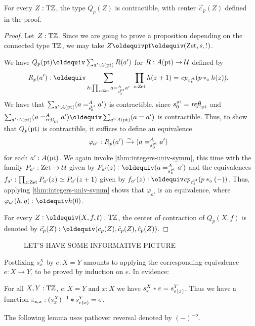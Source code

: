 \documentclass[a4,12pt]{amsart}
\begin{document}
\begin{lemma}\label{lem:guided-null-hmtps-dep}
  For every $Z:{\mathrm{T}\mathbb{Z}}$, the type $Q_p(Z)$ is contractible, 
  with center $\vec{c}_p(Z)$ defined in the proof.
\end{lemma}
\begin{proof}
  Let $Z:{\mathrm{T}\mathbb{Z}}$. Since we are going to prove a proposition
  depending on the connected type ${\mathrm{T}\mathbb{Z}}$,
  we may take $Z\jdeq\pt\jdeq(\zet,s,!)$.

  We have $Q_p(\pt)\jdeq \sum_{a':A(\pt)} R(a')$ for $R : A({\mathord{\mathrm{pt}}}) \to \mathcal{U}$ defined by
  \[
    R_p(a') \defeq \sum_{h : \prod_{z:\zet} a =^A_{s^\pt_z} a'}~\prod_{z:\zet} h(z+1) =  
    \cp{\varepsilon^\pt_z}(p \cto h(z)).
  \]
  We have that $\sum_{a':A({\mathord{\mathrm{pt}}})} (a =^A_{s^{\mathord{\mathrm{pt}}}_0} {a'})$ is contractible,
  since $s^{\mathord{\mathrm{pt}}}_0 = \mathop{{\it refl}_{{\mathord{\mathrm{pt}}}}}$ and 
  $\sum_{a':A(\pt)} (a =^A_{\refl{\pt}} a') \jdeq \sum_{a':A(\pt)} (a = a')$
  is contractible.
  Thus, to show that $Q_p({\mathord{\mathrm{pt}}})$ is contractible,
  it suffices to define an equivalence
  \[
    \varphi_{a'} : R_p(a') \xrightarrow{\sim}{} (a =^A_{s^{\mathord{\mathrm{pt}}}_0} {a'})
  \]
  for each $a' : A({\mathord{\mathrm{pt}}})$.
  We again invoke \cref{thm:integers-univ-symm},
  this time with the family $P_{a'} : \mathrm{Zet} \to \mathcal{U}$ given 
  by $P_{a'}(z) \defeq (a =^A_{s^\pt_z} {a'})$
  and the equivalences $f_{a'} : \prod_{z:\mathrm{Zet}} P_{a'}(z)\simeq P_{a'}(z+1)$ 
  given by $f_{a'}(z) \defeq \cp{\varepsilon^\pt_z}(p \cto ({-}))$.
  Thus, applying \cref{thm:integers-univ-symm}
  shows that $\varphi_{a'}$ is an equivalence,
  where $\varphi_{a'}(h,q) \defeq h(0)$.

For every $Z\defeq(X,f,t):\TorZ$, the center of contraction of $Q_p(X,f)$ 
is denoted by $\vec{c}_p(Z)\defeq(c_p(Z),\tilde{c}_p(Z),\hat{c}_p(Z))$.
\end{proof}


\begin{figure}
\caption{\label{fig:TorZ-induction}LET'S HAVE SOME INFORMATIVE PICTURE}
\end{figure}

Postfixing $s^X_x$ by $e: X=Y$ amounts to
applying the corresponding equivalence $e: X\to Y$, to be proved
by induction on $e$. In evidence:

\begin{lemma}\label{lem:s-X-x-*-e}
  For all $X,Y:{\mathrm{T}\mathbb{Z}}$, $e: X=Y$ and $x:X$ we have $s^X_x * e = s^Y_{e(x)}$.
  Thus we have a function $\varepsilon_{e,x} : (s^X_x)^{-1} * s^Y_{e(x)} = e$.
\end{lemma}

The following lemma uses pathover reversal denoted by $({-})^{-o}$.
\end{document}
